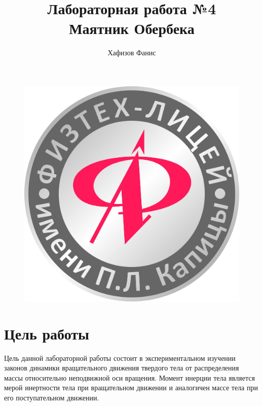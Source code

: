 \documentclass[12pt]{article}
\title{Лабораторная работа №4\\Маятник Обербека}
\author{Хафизов Фанис}
\begin{document}
	\begin{figure}
		\centering
		\includegraphics[width=0.3\linewidth]{logo}
	\end{figure}
	\maketitle
	\newpage
	\section{Цель работы}
	Цель данной лабораторной работы состоит в экспериментальном изучении законов динамики вращательного движения твердого тела от распределения массы
	относительно неподвижной оси вращения. Момент инерции тела является мерой инертности тела при вращательном движении и аналогичен массе тела при
	его поступательном движении.
\end{document}
